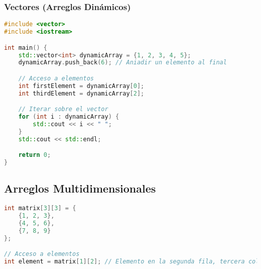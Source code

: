 \subsubsection{Vectores (Arreglos Dinámicos)}

\begin{lstlisting}[language=C++]
#include <vector>
#include <iostream>

int main() {
    std::vector<int> dynamicArray = {1, 2, 3, 4, 5};
    dynamicArray.push_back(6); // Aniadir un elemento al final

    // Acceso a elementos
    int firstElement = dynamicArray[0];
    int thirdElement = dynamicArray[2];

    // Iterar sobre el vector
    for (int i : dynamicArray) {
        std::cout << i << " ";
    }
    std::cout << std::endl;

    return 0;
}
\end{lstlisting}

\subsection{Arreglos Multidimensionales}

\begin{lstlisting}[language=C++]
int matrix[3][3] = {
    {1, 2, 3},
    {4, 5, 6},
    {7, 8, 9}
};

// Acceso a elementos
int element = matrix[1][2]; // Elemento en la segunda fila, tercera columna
\end{lstlisting}